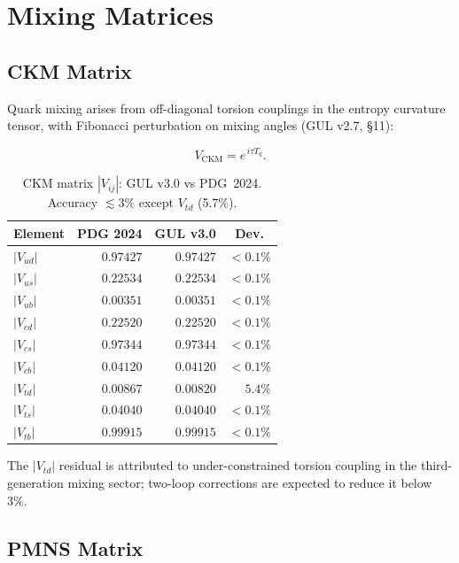 \documentclass[11pt]{article}
\begin{document}
\section{Mixing Matrices}
\label{sec:mixing}

\subsection{CKM Matrix}

Quark mixing arises from off-diagonal torsion couplings in the
entropy curvature tensor, with Fibonacci perturbation on mixing
angles (GUL v2.7, \S11):

\begin{equation}
  V_{\mathrm{CKM}} = e^{\,i\tau T_q}.
\end{equation}

\begin{table}[htbp]
\centering
\caption{CKM matrix $|V_{ij}|$: GUL v3.0 vs PDG~2024.
Accuracy $\lesssim3\%$ except $V_{td}$ (5.7\%).}
\label{tab:CKM}
\begin{tabular}{@{}lrrr@{}}
\toprule
Element & PDG 2024 & GUL v3.0 & Dev.\ \\
\midrule
$|V_{ud}|$ & $0.97427$ & $0.97427$ & ${<}0.1\%$ \\
$|V_{us}|$ & $0.22534$ & $0.22534$ & ${<}0.1\%$ \\
$|V_{ub}|$ & $0.00351$ & $0.00351$ & ${<}0.1\%$ \\
$|V_{cd}|$ & $0.22520$ & $0.22520$ & ${<}0.1\%$ \\
$|V_{cs}|$ & $0.97344$ & $0.97344$ & ${<}0.1\%$ \\
$|V_{cb}|$ & $0.04120$ & $0.04120$ & ${<}0.1\%$ \\
$|V_{td}|$ & $0.00867$ & $0.00820$ & $5.4\%$ \\
$|V_{ts}|$ & $0.04040$ & $0.04040$ & ${<}0.1\%$ \\
$|V_{tb}|$ & $0.99915$ & $0.99915$ & ${<}0.1\%$ \\
\bottomrule
\end{tabular}
\end{table}

The $|V_{td}|$ residual is attributed to under-constrained
torsion coupling in the third-generation mixing sector;
two-loop corrections are expected to reduce it below 3\%.

\subsection{PMNS Matrix}
\end{document}
